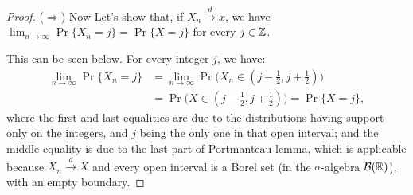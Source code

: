 \documentclass[12pt, letterpaper]{paper}
\begin{document}
\begin{question}
\begin{proof}
($\Longrightarrow$) Now Let's show that, if $X_n\overset{d}{\to}x$, we have $\lim_{n\to\infty}{\Pr\{X_n=j\}}=\Pr\{X=j\}$ for every $j\in\mathbb{Z}$.

This can be seen below. For every integer $j$, we have:
\begin{equation}
    \begin{split}
       \lim_{n\to\infty}{\Pr\{X_n=j\}}&=\lim_{n\to\infty}{\Pr\Big(X_n\in (j-\frac{1}{2},j+\frac{1}{2})\Big)}\\
       &=\Pr\Big(X\in (j-\frac{1}{2},j+\frac{1}{2})\Big)=\Pr\{X=j\},
    \end{split}
\end{equation}
\noindent where the first and last equalities are due to the distributions having support only on the integers, and $j$ being the only one in that open interval; and the middle equality is due to the last part of Portmanteau lemma, which is applicable because $X_n\overset{d}{\to}X$ and every open interval is a Borel set (in the $\sigma$-algebra $\mathcal{B}(\mathbb{R})$), with an empty boundary.
  \end{proof}
\end{question}
\end{document}
